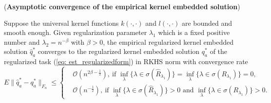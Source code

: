 \begin{theorem}(\textbf{Asymptotic convergence of the empirical kernel embedded solution})

    \label{thm: est_empiricaltokernel}
    Suppose the universal kernel functions $k(\cdot,\cdot)$ and $l(\cdot,\cdot)$ are bounded and smooth enough. 
    Given regularization parameter $\lambda_1$ which is a fixed positive number 
    and $\lambda_2=n^{-\beta}$ with $\beta>0$, 
    the empirical regularized kernel embedded solution $\widehat{q}_a^*$ converges to the regularized kernel embedded solution $q_a^*$ of the regularized task (\ref{eq: est_regularizedform}) in RKHS norm 
    with convergence rate 
    \begin{equation*}
        E\|\widehat{q}_a^*-q_a^*\|_{F_n} \leq\left\{\begin{aligned}
            & \mathcal{O}(n^{2\beta-\frac{1}{2}}),\ \text{if }\inf_{\lambda}\{\lambda\in\sigma(\widehat{R}_{\lambda_1})\} = \inf_{\lambda}\{\lambda\in\sigma(R_{\lambda_1})\} = 0, \\
            & \mathcal{O}(n^{-\frac{1}{2}}),\ \text{if }\inf_{\lambda}\{\lambda\in\sigma(\widehat{R}_{\lambda_1})\}>0 \text{ and } \inf_{\lambda}\{\lambda\in\sigma(R_{\lambda_1})\} > 0.
        \end{aligned}\right.
    \end{equation*}
\end{theorem}
